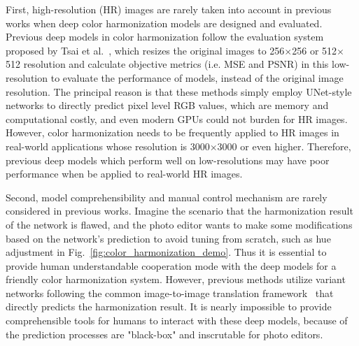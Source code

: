 \documentclass[runningheads]{llncs}
\begin{document}
First, high-resolution (HR) images are rarely taken into account in previous works when deep color harmonization models are designed and evaluated.
    Previous deep models in color harmonization follow the evaluation system proposed by Tsai et al.~\cite{tsai2017deep}, which resizes the original images to 256$\times$256 or 512$\times$512 resolution and calculate objective metrics (i.e. MSE and PSNR) in this low-resolution to evaluate the performance of models, instead of the original image resolution.
    The principal reason is that these methods simply employ UNet-style~\cite{Unet} networks to directly predict pixel level RGB values, which are memory and computational costly, and even modern GPUs could not burden for HR images. 
    However, color harmonization needs to be frequently applied to HR images in real-world applications whose resolution is 3000$\times$3000 or even higher.
    Therefore, previous deep models which perform well on low-resolutions may have poor performance when be applied to real-world HR images.
    
    
Second, model comprehensibility and manual control mechanism are rarely considered in previous works.
    Imagine the scenario that the harmonization result of the network is flawed, and the photo editor wants to make some modifications based on the network's prediction to avoid tuning from scratch, such as hue adjustment in Fig.~\ref{fig:color_harmonization_demo}.
    Thus it is essential to provide human understandable cooperation mode with the deep models for a friendly color harmonization system.
    However, previous methods utilize variant networks following the common image-to-image translation framework~\cite{isola2017image} that directly predicts the harmonization result.
    It is nearly impossible to provide comprehensible tools for humans to interact with these deep models, because of the prediction processes are "black-box" and inscrutable for photo editors.
    
\end{document}
